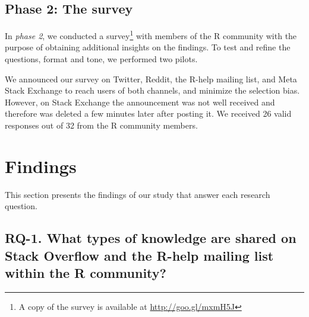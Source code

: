 \documentclass{sig-alternate-05-2015}
\begin{document}
\subsection{Phase 2: The survey} 

In \textit{phase 2}, we conducted a survey\footnote{A copy of the survey is available at \url{http://goo.gl/mxmH5J}} with members of the R community with the purpose of obtaining additional insights on the findings.
To test and refine the questions, format and tone, we performed two pilots.

We announced our survey on Twitter, Reddit, the R-help mailing list, and Meta Stack Exchange to reach users of both channels, and minimize the selection bias.
However, on Stack Exchange the announcement was not well received and therefore was deleted a few minutes later after posting it.
We received 26 valid responses out of 32 from the R community members.


\section{Findings}
\label{cha:findings}

This section presents the findings of our study that answer each research question.

\subsection{RQ-1. What types of knowledge are shared on Stack Overflow and the R-help mailing list within the R community?}
\label{cha:findings-types}
\end{document}
